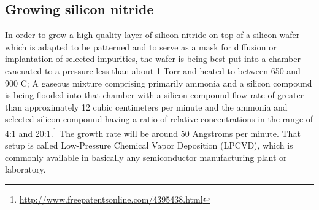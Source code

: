 \subsection{Growing silicon nitride}\label{chemistry_growing_nitride}
In order to grow a high quality layer of silicon nitride on top of a silicon wafer which is adapted to be patterned and to serve as a mask for diffusion or implantation of selected impurities, the wafer is being best put into a chamber evacuated to a pressure less than about 1 Torr and heated to between 650 and 900 \degree C;
A gaseous mixture comprising primarily ammonia and a silicon compound is being flooded into that chamber with a silicon compound flow rate of greater than approximately 12 cubic centimeters per minute and the ammonia and selected silicon compound having a ratio of relative concentrations in the range of 4:1 and 20:1.\footnote{\url{http://www.freepatentsonline.com/4395438.html}}
The growth rate will be around 50 Angstroms per minute.
That setup is called Low-Pressure Chemical Vapor Deposition (LPCVD), which is commonly available in basically any semiconductor manufacturing plant or laboratory.
